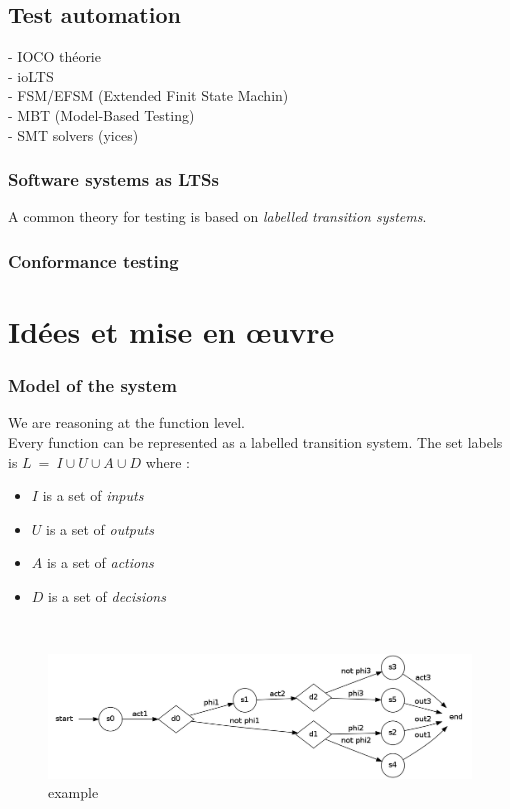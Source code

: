\documentclass[a4paper]{report}
\begin{document}
\section*{Test automation}
- IOCO théorie\\
- ioLTS\\
- FSM/EFSM (Extended Finit State Machin)\\
- MBT (Model-Based Testing)\\
- SMT solvers (yices)\\

\subsection*{Software systems as LTSs}
A common theory for testing is based on \textit{labelled transition systems}.
\subsection*{Conformance testing}





\chapter*{Idées et mise en œuvre}

\subsection*{Model of the system}

We are reasoning at the function level.\\
Every function can be represented as a labelled transition system. The set labels is $L\ =\ I \cup U \cup A \cup D$ where :\\
\begin{itemize}
\item $I$ is a set of \textit{inputs}
\item $U$ is a set of \textit{outputs}
\item $A$ is a set of \textit{actions}
\item $D$ is a set of \textit{decisions}
\end{itemize}
$ $\\
\newline
\begin{figure}[h!]
   \caption{\label{étiquette} example}
   \includegraphics[scale=0.3]{../graphviz/LTSExample.png}
\end{figure}
\end{document}
